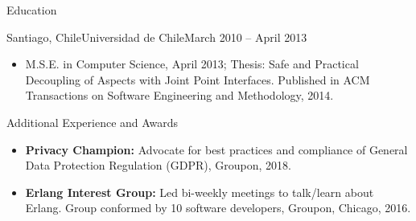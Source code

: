 \documentclass[includefoot]{mcdowellcv}
\begin{document}
	\begin{cvsection}{Education}
		\begin{cvsubsection}{Santiago, Chile}{Universidad de Chile}{March 2010 --  April 2013}
			\begin{itemize}
				\item M.S.E. in Computer Science, April 2013; Thesis: Safe and Practical Decoupling of Aspects with Joint Point Interfaces. Published in ACM Transactions on Software Engineering and Methodology, 2014.
			\end{itemize}
		\end{cvsubsection}
	\end{cvsection}
	
	
	\begin{cvsection}{Additional Experience and Awards}
		\begin{cvsubsection}{}{}{}	
			\begin{itemize}
			        \item \textbf{Privacy Champion:} Advocate for best practices and compliance of General Data Protection Regulation (GDPR), Groupon, 2018.
			        \item \textbf{Erlang Interest Group:} Led bi-weekly meetings to talk/learn about Erlang. Group conformed by 10 software developers, Groupon, Chicago, 2016.
			\end{itemize}
		\end{cvsubsection}
	\end{cvsection}
	
\end{document}
